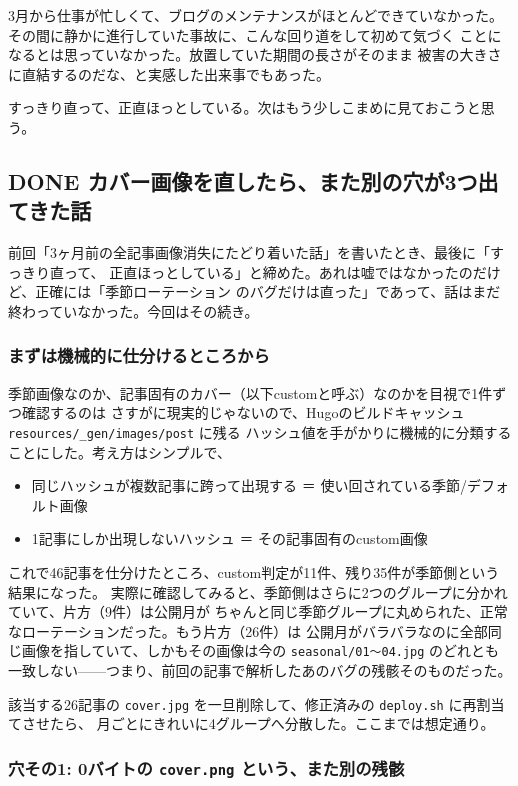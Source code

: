 \documentclass[11pt]{article}
\begin{document}
3月から仕事が忙しくて、ブログのメンテナンスがほとんどできていなかった。
その間に静かに進行していた事故に、こんな回り道をして初めて気づく
ことになるとは思っていなかった。放置していた期間の長さがそのまま
被害の大きさに直結するのだな、と実感した出来事でもあった。

すっきり直って、正直ほっとしている。次はもう少しこまめに見ておこうと思う。
\subsection{{\bfseries\sffamily DONE} カバー画像を直したら、また別の穴が3つ出てきた話}
\label{sec:org4d6f50d}
前回「3ヶ月前の全記事画像消失にたどり着いた話」を書いたとき、最後に「すっきり直って、
正直ほっとしている」と締めた。あれは嘘ではなかったのだけど、正確には「季節ローテーション
のバグだけは直った」であって、話はまだ終わっていなかった。今回はその続き。
\subsubsection{まずは機械的に仕分けるところから}
\label{sec:orgd572e13}

季節画像なのか、記事固有のカバー（以下customと呼ぶ）なのかを目視で1件ずつ確認するのは
さすがに現実的じゃないので、Hugoのビルドキャッシュ \texttt{resources/\_gen/images/post} に残る
ハッシュ値を手がかりに機械的に分類することにした。考え方はシンプルで、

\begin{itemize}
\item 同じハッシュが複数記事に跨って出現する ＝ 使い回されている季節/デフォルト画像
\item 1記事にしか出現しないハッシュ ＝ その記事固有のcustom画像
\end{itemize}

これで46記事を仕分けたところ、custom判定が11件、残り35件が季節側という結果になった。
実際に確認してみると、季節側はさらに2つのグループに分かれていて、片方（9件）は公開月が
ちゃんと同じ季節グループに丸められた、正常なローテーションだった。もう片方（26件）は
公開月がバラバラなのに全部同じ画像を指していて、しかもその画像は今の \texttt{seasonal/01〜04.jpg}
のどれとも一致しない——つまり、前回の記事で解析したあのバグの残骸そのものだった。

該当する26記事の \texttt{cover.jpg} を一旦削除して、修正済みの \texttt{deploy.sh} に再割当てさせたら、
月ごとにきれいに4グループへ分散した。ここまでは想定通り。
\subsubsection{穴その1: 0バイトの \texttt{cover.png} という、また別の残骸}
\label{sec:org7448b52}
\end{document}

